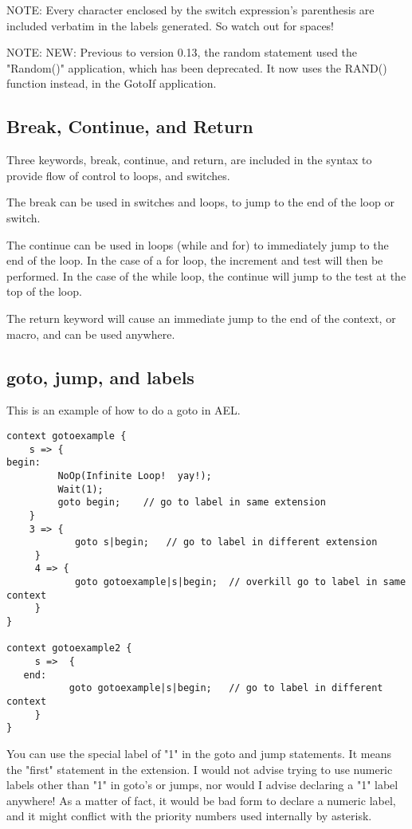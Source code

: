 {NOTE: Every character enclosed by the switch expression's parenthesis
      are included verbatim in the labels generated. So watch out for
      spaces!

NOTE: NEW: Previous to version 0.13, the random statement used the
      "Random()" application, which has been deprecated. It now uses
      the RAND() function instead, in the GotoIf application.


\subsection{Break, Continue, and Return}

Three keywords, break, continue, and return, are included in the
syntax to provide flow of control to loops, and switches.

The break can be used in switches and loops, to jump to the end of the
loop or switch.

The continue can be used in loops (while and for) to immediately jump
to the end of the loop. In the case of a for loop, the increment and
test will then be performed. In the case of the while loop, the
continue will jump to the test at the top of the loop.

The return keyword will cause an immediate jump to the end of the
context, or macro, and can be used anywhere.



\subsection{goto, jump, and labels}

This is an example of how to do a goto in AEL.

\begin{verbatim}
context gotoexample {
    s => {
begin:
         NoOp(Infinite Loop!  yay!);
         Wait(1);
         goto begin;    // go to label in same extension
    }
    3 => {
            goto s|begin;   // go to label in different extension
     }
     4 => {
            goto gotoexample|s|begin;  // overkill go to label in same context
     }
}

context gotoexample2 {
     s =>  {
   end:
           goto gotoexample|s|begin;   // go to label in different context
     }
}
\end{verbatim}

You can use the special label of "1" in the goto and jump
statements. It means the "first" statement in the extension. I would
not advise trying to use numeric labels other than "1" in goto's or
jumps, nor would I advise declaring a "1" label anywhere! As a matter
of fact, it would be bad form to declare a numeric label, and it might
conflict with the priority numbers used internally by asterisk.

}
